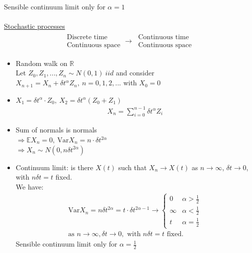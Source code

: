 \documentclass[12pt, letterpaper]{article}
\begin{document}
Sensible continuum limit only for $\alpha = 1$ \\ \\
\underline{Stochastic processes} \\
\begin{align*}
    \begin{matrix}
        \text{Discrete time} \\ \text{Continuous space} 
    \end{matrix} \rightarrow\ 
    \begin{matrix}
        \text{Continuous time} \\ \text{Continuous space}
    \end{matrix}
\end{align*}
\begin{itemize}
    \item Random walk on $\mathbb{R}$ \\
    Let $Z_0, Z_1, ..., Z_n \sim N(0,1)\ iid$ and consider 
    $X_{n+1} = X_n+ \delta t^\alpha Z_n,\ n = 0,1,2,...$ with $X_0 = 0$
    \item $X_1 = \delta t^\alpha \cdot Z_0,\ X_2 = \delta t^\alpha (Z_0 + Z_1)$
    \begin{align*}
        X_n = \sum_{i=0}^{n-1} \delta t^\alpha Z_i
    \end{align*}
    \item Sum of normals is normals \\
    $\Rightarrow \mathbb{E}X_n = 0,\ \text{Var}X_n = n \cdot \delta t^{2\alpha}$ \\
    $\Rightarrow X_n \sim N(0, n \delta t^{2\alpha})$
    \item Continuum limit: is there $X(t)$ such that $X_n \rightarrow X(t)$ as 
    $n \rightarrow \infty$, $\delta t \rightarrow 0$, with $n\delta t = t$ fixed. \\
    We have: 
    \begin{align*}
        \text{Var}X_n = n\delta t^{2\alpha} = t\cdot \delta t^{2\alpha -1} \rightarrow 
        \begin{cases}
            0 & \alpha > \frac12 \\
            \infty & \alpha < \frac 12 \\
            t & \alpha = \frac 12
        \end{cases} \\
        \text{as } 
    n \rightarrow \infty, \delta t \rightarrow 0, \text{ with } n\delta t = t \text{ fixed}.
    \end{align*}
    Sensible continuum limit only for $\alpha = \frac 12$
\end{itemize}
\end{document}
